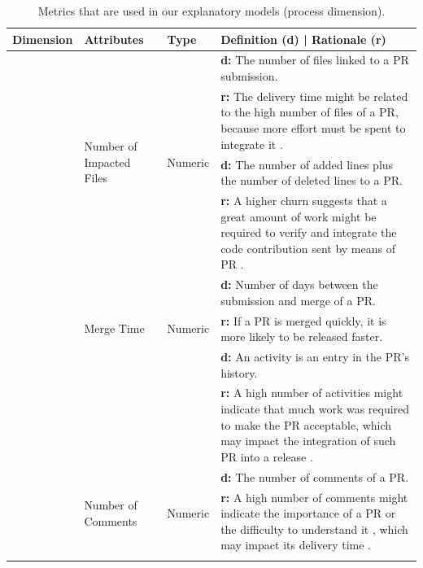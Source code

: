 \begin{table}[htbp]
	\caption{Metrics that are used in our explanatory models (process dimension).}
	\footnotesize
	\begin{tabular}{| >{\centering\arraybackslash}m{0.45in}|m{0.60in}|m{0.4in}|m{2.5in}|}			
		\hline
		\textbf{Dimension} & \textbf{Attributes} & \textbf{Type} & \textbf{Definition (d) | Rationale (r)} \\ \hline
		
		\multirow{33}{*}{Process} & \multirow{4}{2cm}{Number of Impacted  Files} & \multirow{4}{*}{Numeric} & \textbf{d:} The number of files linked to a PR submission.  \\ \cline{4-4}
		& &  & \textbf{r:} The delivery time might be related to the high number of files of a PR, because more effort must be spent to integrate it \citep{jiang2013will}.   \\ \cline{ 2- 4}
		
		& \multirow{5}{*}{Churn} & \multirow{5}{*}{Numeric} & \textbf{d:} The number of added lines plus the number of deleted lines to a PR.
		\\ \cline{4-4}
		& &  & \textbf{r:} A higher churn suggests that a great amount of work might be required to verify and integrate the code contribution sent by means of PR \citep{jiang2013will, nagappan2005use}.  \\ \cline{ 2- 4}
		
		& \multirow{3}{*}{Merge Time} & \multirow{3}{*}{Numeric} & \textbf{d:} Number of days between the submission and merge of a PR.
		\\ \cline{4-4}
		& &  & \textbf{r:} If a PR is merged quickly, it is more likely to be released faster.  \\ \cline{ 2- 4}
		
		& \multirow{5}{2cm}{Number of Activities} & \multirow{5}{*}{Numeric} & \textbf{d:} An activity is an entry in the PR's history. 
		\\ \cline{4-4}
		& &  & \textbf{r:} A high number of activities might indicate that much work was required to make the PR acceptable, which may impact the integration of such PR into a release \citep{jiang2013will}.  \\ \cline{ 2- 4}
		
		& \multirow{5}{2cm}{Number of Comments} & \multirow{5}{*}{Numeric} & \textbf{d:} 
		The number of comments of a PR.  \\ \cline{4-4}
		& &  & \textbf{r:} A high number of comments might indicate the
		importance of a PR or the difficulty to understand it
		\citep{giger2010predicting}, which may impact its delivery time \citep{jiang2013will}. \\ \cline{ 2- 4}
		

\end{tabular}
\end{table}

